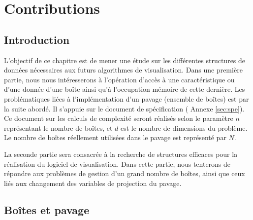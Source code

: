 \chapter{Contributions}\label{chap:con}


\section{Introduction}%

L'objectif de ce chapitre est de mener une étude sur les différentes structures de données nécessaires aux futurs algorithmes de visualisation. Dans une première partie, nous nous intéresserons à l'opération d'accès à une caractéristique ou d'une donnée d'une boîte ainsi qu'à l'occupation mémoire de cette dernière. Les problématiques liées à l'implémentation d'un pavage (ensemble de boîtes) est par la suite abordé. Il s'appuie sur le document de spécification (\cf{}  Annexe \ref{sec:spe}). Ce document sur les calculs de complexité seront réalisés selon le paramètre $n$  représentant le nombre de boîtes, et $d$ est le nombre de dimensions du problème. Le nombre de boîtes réellement utilisées dans le pavage est représenté par $N$. 


La seconde partie sera consacrée à la recherche de structures efficaces pour la réalisation du logiciel de visualisation. Dans cette partie, nous tenterons de répondre aux problèmes de gestion d'un grand nombre de boîtes, ainsi que ceux liés aux changement des variables de projection du pavage.




\section{Boîtes et pavage}

